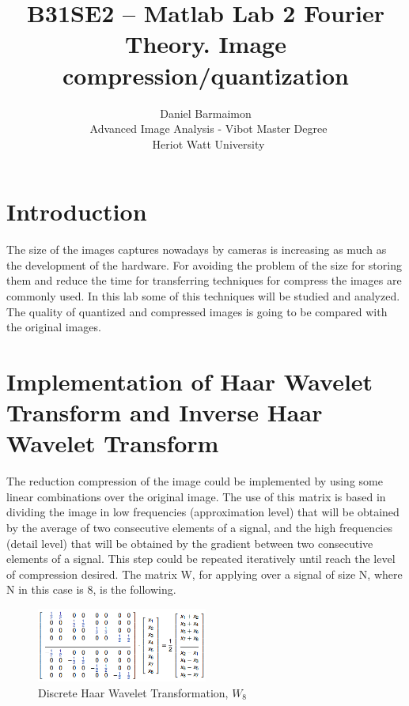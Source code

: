 \documentclass[a4paper, 10pt, conference] {article}
\begin{document}
\date{}
\title{\LARGE \bf
B31SE2 – Matlab Lab 2
Fourier Theory. Image compression/quantization
}

\author{ \parbox{5 in}{\centering Daniel Barmaimon \\
         \ Advanced Image Analysis - Vibot Master Degree\\
         \ Heriot Watt University\\         
}}

\maketitle


\section{Introduction}
The size of the images captures nowadays by cameras is increasing as much as the development of the hardware. For avoiding the problem of the size for storing them and reduce the time for transferring techniques for compress the images are commonly used. In this lab some of this techniques will be studied and analyzed. The quality of quantized and compressed images is going to be compared with the original images.
\section{Implementation of Haar Wavelet Transform and Inverse Haar Wavelet Transform}
The reduction compression of the image could be implemented by using some linear combinations over the original image. The use of this matrix is based in dividing the image in low frequencies (approximation level) that will be obtained by the average of two consecutive elements of a signal, and the high frequencies (detail level) that will be obtained by the gradient between two consecutive elements of a signal. This step could be repeated iteratively until reach the level of compression desired. 
The matrix W, for applying over a signal of size N, where N in this case is 8, is the following.
\begin{figure}[H]
	\centering
	\includegraphics[width=0.5\textwidth]{reportImages/W.png} %
	\caption{Discrete Haar Wavelet Transformation, $W_{8}$}
	\label{W}
\end{figure}
\end{document}
